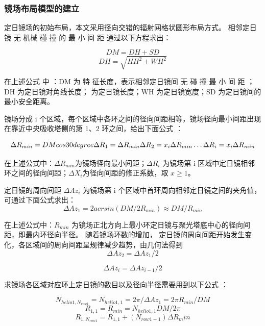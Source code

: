 \documentclass[withoutpreface,bwprint]{cumcmthesis} %
\begin{document}
\subsubsection{镜场布局模型的建立}

定日镜场的初始布局，本文采用径向交错的辐射网格状圆形布局方式。
相邻定日镜 无 机械 碰 撞 的 最 小 间 距 通过以下方程求出：

\begin{equation}
    DM=DH+SD
\end{equation}
\begin{equation}
    DH=\sqrt{HH^2+WH^2}
\end{equation}

在上述公式 中 ：DM 为 特 征长度，表示相邻定日镜间 无 碰 撞 最 小 间 距 ；DH 为定日镜对角线长度； 为定日镜长度；WH 为定日镜宽度；SD 为定日镜间的最小安全距离。

镜场分成 i 个区域，每个区域中各环之间的径向间距相等，镜场径向最小间距出现在靠近中央吸收塔侧的第 1、2 环之间，给出下面公式  ：

\begin{equation}
    \Delta R_{min}=DMcos30 degree \\
    \Delta R_{1}=\Delta R_{min} \\
    \Delta R_{2}=x_{i}\Delta R_{min} \\
    \ldots \\
    \Delta R_{i}=x_{i}\Delta R_{min} \\
\end{equation}

在上述公式中：$\Delta R_{min}$为镜场径向最小间距；$\Delta R_{i}$ 为镜场第 i 区域中定日镜相邻环之间的径向间距；$\Delta X_{i}$为径向间距的修正系数，取 $x \geq 1 $。

定日镜的周向间距 $\Delta Az_{i}$ 为镜场第 i 个区域中首环周向相邻定日镜之间的夹角值，可通过下面公式求出：$$\Delta Az_{1}=2acrsin(DM/2R_{min})\approx DM/R_{min} $$

在上述公式中：$R_{min}$ 为镜场正北方向上最小环定日镜与聚光塔底中心的径向间距，即最内环径向半径。
随着镜场环数的增加， 定日镜的周向间距开始发生变化，各区域间的周向间距呈规律减少趋势，由几何法得到  $$\Delta Az_{2}=\Delta Az_{1}/2$$

$$\Delta Az_{i}=\Delta Az_{i-1}/2$$

求镜场各区域对应环上定日镜的数目以及径向半径需要用到以下公式  ：

$$N_{helio1,N_{row1}}=N_{helio1,1}=2\pi /\Delta Az_{1}=2\pi R_{min}/DM$$
$$R_{1,1}=R_{min}=N_{helio1,1}DM/2\pi$$
$$R_{1,N_{row1}}=R_{1,1}+(N_{row1-1})\Delta R_min$$
\end{document}

